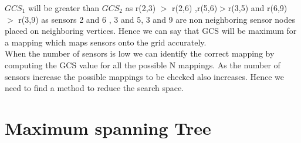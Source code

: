 $GCS_{1}$ will be greater than $GCS_{2}$ as r(2,3) $>$ r(2,6) ,r(5,6)$>$r(3,5) and r(6,9) $>$ r(3,9) as sensors 2 and 6 , 3 and 5, 3 and 9 are non neighboring sensor nodes placed on neighboring vertices. Hence we can say that GCS will be maximum for a  mapping which maps sensors onto the grid accurately.\\
When the number of sensors is low we can identify the correct mapping by computing the GCS value for all the possible N mappings. As the number of sensors increase the possible mappings to be checked also increases. Hence we need to find a method to reduce the search space.

\section{Maximum spanning Tree}

